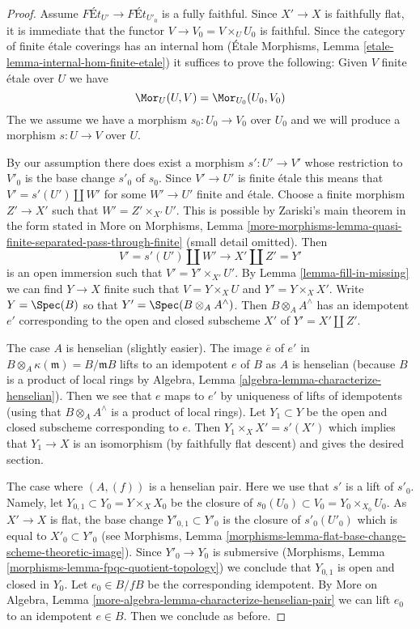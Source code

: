 \begin{proof}
Assume $\textit{F\'Et}_{U'} \longrightarrow \textit{F\'Et}_{U'_0}$
is a fully faithful. Since $X' \to X$ is faithfully flat, it is
immediate that the functor $V \to V_0 = V \times_U U_0$ is faithful.
Since the category of finite \'etale coverings has an internal hom
(\'Etale Morphisms, Lemma \ref{etale-lemma-internal-hom-finite-etale})
it suffices to prove the following: Given $V$ finite \'etale over $U$
we have
$$
\Mor_U(U, V) = \Mor_{U_0}(U_0, V_0)
$$
The we assume we have a morphism $s_0 : U_0 \to V_0$ over $U_0$ and we will
produce a morphism $s : U \to V$ over $U$.

\medskip\noindent
By our assumption there does exist a morphism $s' : U' \to V'$
whose restriction to $V'_0$ is the base change $s'_0$ of $s_0$.
Since $V' \to U'$ is finite \'etale this means that $V' = s'(U') \amalg W'$
for some $W' \to U'$ finite and \'etale.
Choose a finite morphism $Z' \to X'$ such that $W' = Z' \times_{X'} U'$.
This is possible by Zariski's main theorem in the form stated in
More on Morphisms, Lemma
\ref{more-morphisms-lemma-quasi-finite-separated-pass-through-finite}
(small detail omitted).
Then
$$
V' = s'(U') \amalg W' \longrightarrow X' \amalg Z' = Y'
$$
is an open immersion such that $V' = Y' \times_{X'} U'$.
By Lemma \ref{lemma-fill-in-missing} we can find $Y \to X$ finite
such that $V = Y \times_X U$ and $Y' = Y \times_X X'$.
Write $Y = \Spec(B)$ so that $Y' = \Spec(B \otimes_A A^\wedge)$.
Then $B \otimes_A A^\wedge$ has an idempotent $e'$
corresponding to the open and closed subscheme $X'$ of $Y' = X' \amalg Z'$.

\medskip\noindent
The case $A$ is henselian (slightly easier). The image $\overline{e}$
of $e'$ in $B \otimes_A \kappa(\mathfrak m) = B/\mathfrak mB$ lifts to an
idempotent $e$ of $B$ as $A$ is henselian (because $B$ is a product of
local rings by Algebra, Lemma \ref{algebra-lemma-characterize-henselian}).
Then we see that $e$ maps to $e'$ by uniqueness of lifts of idempotents
(using that $B \otimes_A A^\wedge$ is a product of local rings).
Let $Y_1 \subset Y$ be the open and closed subscheme corresponding to $e$.
Then $Y_1 \times_X X' = s'(X')$ which implies that $Y_1 \to X$ is
an isomorphism (by faithfully flat descent) and gives the desired section.

\medskip\noindent
The case where $(A, (f))$ is a henselian pair. Here we use that $s'$ is
a lift of $s'_0$. Namely, let $Y_{0, 1} \subset Y_0 = Y \times_X X_0$
be the closure of $s_0(U_0) \subset V_0 = Y_0 \times_{X_0} U_0$.
As $X' \to X$ is flat, the base change $Y'_{0, 1} \subset Y'_0$
is the closure of $s'_0(U'_0)$ which is equal to $X'_0 \subset Y'_0$
(see Morphisms, Lemma
\ref{morphisms-lemma-flat-base-change-scheme-theoretic-image}).
Since $Y'_0 \to Y_0$ is submersive
(Morphisms, Lemma \ref{morphisms-lemma-fpqc-quotient-topology})
we conclude that $Y_{0, 1}$ is open and closed in $Y_0$.
Let $e_0 \in B/fB$ be the corresponding idempotent.
By More on Algebra, Lemma
\ref{more-algebra-lemma-characterize-henselian-pair}
we can lift $e_0$ to an idempotent $e \in B$.
Then we conclude as before.
\end{proof}

